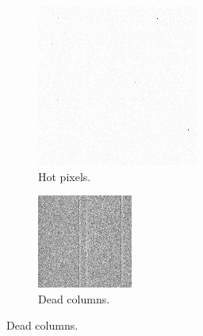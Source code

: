     
    \begin{figure}[!h]
    \centering
        \begin{subfigure}{.3\textwidth}
        \centering
            \includegraphics[width=\textwidth]{images/hotpixels.png}
            \caption{Hot pixels.}
            \label{fig:hotpixels}
        \end{subfigure}
        \begin{subfigure}{.3\textwidth}
            \centering
            \includegraphics[width=\textwidth]{images/deadcolumns.jpg}
            \caption{Dead columns.}
            \label{fig:deadcolumns}
        \end{subfigure}
        

\end{figure}
